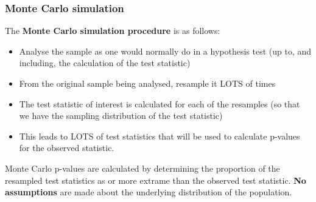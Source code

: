 \documentclass[a4paper]{article}\usepackage[]{graphicx}\usepackage[]{xcolor}
\begin{document}
\subsubsection{Monte Carlo simulation}
The \textbf{Monte Carlo simulation procedure} is as follows:
\begin{itemize}
	\item Analyse the sample as one would normally do in a hypothesis test (up to, and including, the calculation of the test statistic)
	\item From the original sample being analysed, resample it LOTS of times
	\item The test statistic of interest is calculated for each of the resamples (so that we have the sampling distribution of the test statistic)
	\item This leads to LOTS of test statistics that will be used to calculate p-values for the observed statistic.
\end{itemize}
Monte Carlo p-values are calculated by determining the proportion of the resampled test statistics as or more extrame than the observed test statistic.
\textbf{No assumptions} are made about the underlying distribution of the population.
\end{document}

